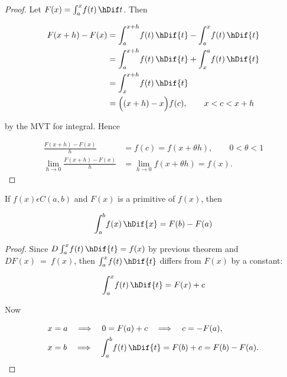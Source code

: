 \documentclass[11pt]{amsbook}
\begin{document}


\begin{proof}
	Let $F(x) = \int_{a}^{x} \! f(t) \, \hDif t$. Then
	
	\begin{align*}
		F(x+h) - F(x) &= \int_{a}^{x+h} \! f(t) \, \hDif{t} - \int_{a}^{x} \! f(t) \, \hDif{t} \\
		&= \int_{a}^{x+h} \! f(t) \, \hDif{t} + \int_{x}^{a} \! f(t) \, \hDif{t}\\
		&= \int_{x}^{x+h} \! f(t) \, \hDif{t} \\
		&= \Big((x+h)-x\Big) f(c), \quad\quad x < c < x+h
	\end{align*}
	
	\noindent by the MVT for integral. Hence
	
	\begin{align*}
		\frac{F(x+h) - F(x)}{h} &= f(c) = f(x+ \theta h), \quad\quad 0< \theta < 1 \\
		\lim_{h \to 0} \frac{F(x+h) - F(x)}{h} &= \lim_{h \to 0} f(x + \theta h) = f(x).
	\end{align*}
\end{proof}

\begin{thm}
	If $f(x) \epsilon C(a,b)$ and $F(x)$ is a primitive of $f(x)$, then

	\begin{equation*}
		\int_{a}^{b} \! f(x) \, \hDif{x} = F(b) - F(a)
	\end{equation*}
\end{thm}

\begin{proof}
	Since $D \int_{a}^{x} \! f(t) \, \hDif{t} = f(x)$ by previous theorem and $DF(x)~=~f(x)$,  %
	then $\int_{a}^{x} \! f(t) \, \hDif{t}$ differs from $F(x)$ by a constant:

	\begin{equation*}
		\int_{a}^{x} \! f(t) \, \hDif{t} = F(x) + c
	\end{equation*}

	\noindent Now

	\begin{align*}
		x &= a \quad\Longrightarrow\quad 0 = F(a) + c \quad\Longrightarrow\quad c = -F(a),\\
		x &= b \quad\Longrightarrow\quad \int_{a}^{b} \! f(t) \, \hDif{t} = F(b) + c = F(b) - F(a).
	\end{align*}
\end{proof}
\end{document}
